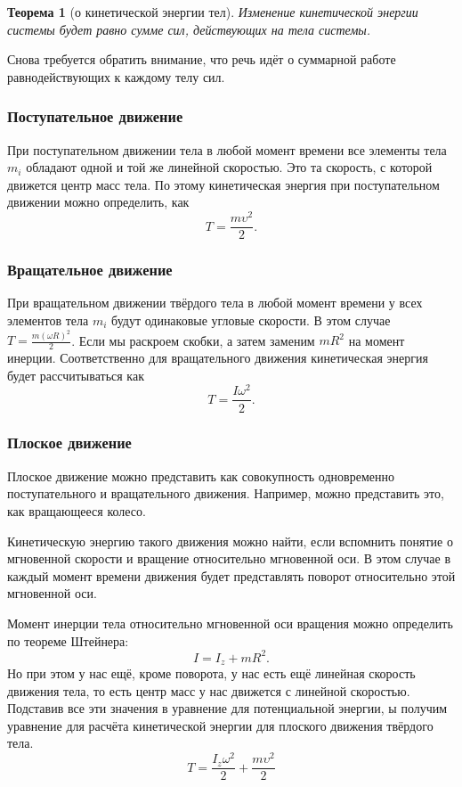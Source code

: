 \documentclass[10pt]{scrbook}
\newtheorem{theorem}{Теорема}[section]
\begin{document}
\begin{theorem}[о кинетической энергии тел]%
	\label{thrm:kinetic-energy}
	Изменение кинетичес\-кой энергии системы будет равно сумме сил, действующих на
	тела системы.
\end{theorem}

Снова требуется обратить внимание, что речь идёт о суммарной работе
равнодействующих к каждому телу сил.

\subsubsection{Поступательное движение}
При поступательном движении тела в любой момент времени все элементы тела $m_i$
обладают одной и той же линейной скоростью. Это та скорость, с которой движется
центр масс тела. По этому кинетическая энергия при поступательном движении
можно определить, как \[
	T = \frac{m \upsilon^2}{2}
	.\]

\subsubsection{Вращательное движение}
При вращательном движении твёрдого тела в любой момент времени у всех элементов
тела $m_i$ будут одинаковые угловые скорости. В этом случае \( T = \frac{m
	(\omega R)^2}{2} \). Если мы раскроем скобки, а затем заменим \( m R^2 \) на
момент инерции. Соответственно для вращательного движения кинетическая энергия
будет рассчитываться как \[
	T = \frac{I \omega^2}{2}
	.\]

\subsubsection{Плоское движение}

Плоское движение можно представить как совокупность одновременно
поступательного и вращательного движения. Например, можно представить это, как
вращающееся колесо.

Кинетическую энергию такого движения можно найти, если вспомнить понятие о
мгновенной скорости и вращение относительно мгновенной оси. В этом случае в
каждый момент времени движения будет представлять поворот относительно этой
мгновенной оси.

Момент инерции тела относительно мгновенной оси вращения можно определить по
теореме Штейнера: \[
	I = I_z + mR^2
	.\] Но при этом у нас ещё, кроме поворота, у нас есть ещё линейная скорость
движения тела, то есть центр масс у нас движется с линейной скоростью. Подставив
все эти значения в уравнение для потенциальной энергии, ы получим уравнение для
расчёта кинетической энергии для плоского движения твёрдого тела.
\begin{equation}
	T = \frac{I_z \omega^2}{2} + \frac{m \upsilon^2}{2}
\end{equation}
\end{document}
